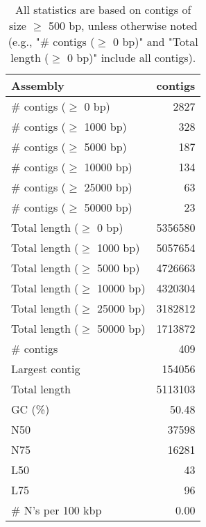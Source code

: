 \documentclass[12pt,a4paper]{article}
\begin{document}
\begin{table}[ht]
\begin{center}
\caption{All statistics are based on contigs of size $\geq$ 500 bp, unless otherwise noted (e.g., "\# contigs ($\geq$ 0 bp)" and "Total length ($\geq$ 0 bp)" include all contigs).}
\begin{tabular}{|l*{1}{|r}|}
\hline
Assembly & contigs \\ \hline
\# contigs ($\geq$ 0 bp) & 2827 \\ \hline
\# contigs ($\geq$ 1000 bp) & 328 \\ \hline
\# contigs ($\geq$ 5000 bp) & 187 \\ \hline
\# contigs ($\geq$ 10000 bp) & 134 \\ \hline
\# contigs ($\geq$ 25000 bp) & 63 \\ \hline
\# contigs ($\geq$ 50000 bp) & 23 \\ \hline
Total length ($\geq$ 0 bp) & 5356580 \\ \hline
Total length ($\geq$ 1000 bp) & 5057654 \\ \hline
Total length ($\geq$ 5000 bp) & 4726663 \\ \hline
Total length ($\geq$ 10000 bp) & 4320304 \\ \hline
Total length ($\geq$ 25000 bp) & 3182812 \\ \hline
Total length ($\geq$ 50000 bp) & 1713872 \\ \hline
\# contigs & 409 \\ \hline
Largest contig & 154056 \\ \hline
Total length & 5113103 \\ \hline
GC (\%) & 50.48 \\ \hline
N50 & 37598 \\ \hline
N75 & 16281 \\ \hline
L50 & 43 \\ \hline
L75 & 96 \\ \hline
\# N's per 100 kbp & 0.00 \\ \hline
\end{tabular}
\end{center}
\end{table}
\end{document}
